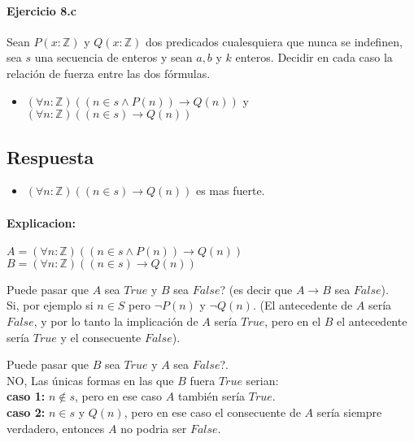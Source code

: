 \documentclass[a4paper]{article}
\begin{document}
\paragraph{Ejercicio 8.c} Sean $P(x:\mathbb{Z})$ y $Q(x:\mathbb{Z})$ dos predicados cualesquiera que nunca se indefinen, sea $s$ una secuencia de enteros y sean $a,b$ y $k$ enteros. Decidir en cada caso la relación de fuerza entre las dos fórmulas.

\begin{itemize}
	\item $(\forall n:\mathbb{Z})((n \in s \wedge P(n))\rightarrow Q(n))$ y $(\forall n: \mathbb{Z})((n \in s)\rightarrow Q(n))$
\end{itemize}

\subsection*{Respuesta}

\begin{itemize}
\item $(\forall n: \mathbb{Z})((n \in s)\rightarrow Q(n))$ es mas fuerte.\\
\end{itemize}
\paragraph*{Explicacion:}
\begin{flushleft}
$A= (\forall n:\mathbb{Z})((n \in s \wedge P(n))\rightarrow Q(n))$\\
$B=(\forall n: \mathbb{Z})((n \in s)\rightarrow Q(n))$\\
\end{flushleft} 

Puede pasar que $A$ sea $True$ y $B$ sea $False$? (es decir que $A \rightarrow B$ sea $False$).\smallskip \\ 
Si, por ejemplo si $n \in S$ pero $\neg P(n)$ y $\neg Q(n)$. (El antecedente de $A$ sería $False$, y por lo tanto la implicación de $A$ sería $True$, pero en el $B$ el antecedente sería $True$ y el consecuente $False$).\par \medskip
Puede pasar que $B$ sea $True$ y $A$ sea $False$?.\smallskip \\
NO, Las únicas formas en las que $B$ fuera $True$ serian:\medskip \\
\textbf{caso 1:} $n\not\in s$, pero en ese caso $A$ también sería $True$.\smallskip \\
\textbf{caso 2:} $n\in s$ y $Q(n)$, pero en ese caso el consecuente de $A$ sería siempre verdadero, entonces $A$ no podria ser $False$.
\end{document}
